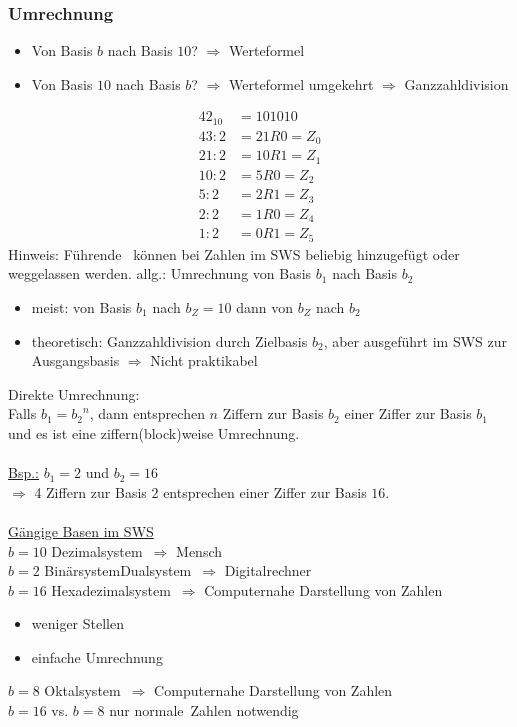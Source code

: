 \documentclass[10pt,a4paper]{scrartcl}
\begin{document}
	\subsubsection*{Umrechnung}
	\begin{itemize}
		\item Von Basis $b$ nach Basis $10$?
		\subitem $\Rightarrow$ Werteformel
		\item Von Basis $10$ nach Basis $ b $?
		\subitem $ \Rightarrow $ Werteformel umgekehrt
		\subitem $ \Rightarrow $ Ganzzahldivision
	\end{itemize}
	\begin{equation*}
	\begin{split}
	{42}_{10} &= 101010\\	
	43:2 &= 21R0 = Z_0\\
	21:2 &= 10R1 = Z_1\\
	10:2 &= 5R0 = Z_2\\
	5:2  &= 2R1 = Z_3\\
	2:2  &= 1R0 =Z_4\\
	1:2	&= 0R1 = Z_5
	\end{split}
	\end{equation*}
	Hinweis: Führende \grqq\ können bei Zahlen im \ac{SWS} beliebig hinzugefügt oder weggelassen werden. 
	allg.: Umrechnung von Basis $b_1$ nach Basis $b_2$
	\begin{itemize}
		\item meist: von Basis $b_1$ nach $b_Z=10$ dann von $b_Z$ nach $b_2$
		\item theoretisch: Ganzzahldivision durch Zielbasis $b_2$, aber ausgeführt im \ac{SWS} zur Ausgangsbasis $\Rightarrow$ Nicht praktikabel
	\end{itemize}
	Direkte Umrechnung:\\
	Falls $ b_1 = {b_2}^n $, dann entsprechen $n$ Ziffern zur Basis $ b_2 $ einer Ziffer zur Basis $ b_1 $ und es ist eine ziffern(block)weise Umrechnung.\\
	\\
	\underline{Bsp.:} $ b_1=2 $ und $ b_2=16 $\\
	$ \Rightarrow $ 4 Ziffern zur Basis $ 2 $ entsprechen einer Ziffer zur Basis $ 16 $.\\ \\
	
	\noindent
	\underline{Gängige Basen im \ac{SWS}}\\
	$ b=10 $ \glqq Dezimalsystem\grqq\ $ \Rightarrow $ Mensch\\
	$ b=2 $ \glqq Binärsystem\grqq\/\glqq Dualsystem\grqq\ $ \Rightarrow $ Digitalrechner \\
	$ b=16 $ \glqq Hexadezimalsystem\grqq\ $ \Rightarrow $ Computernahe Darstellung von Zahlen
	\begin{itemize}
		\itemsep0em
		\vspace{-0.2cm}
		\item weniger Stellen
		\item einfache Umrechnung
	\end{itemize}
	$ b=8 $ \glqq Oktalsystem\grqq\ $ \Rightarrow $ Computernahe Darstellung von Zahlen\\
	$ b=16 $ vs. $ b=8 $ nur \glqq normale\grqq\ Zahlen notwendig
	
\end{document}
